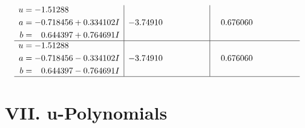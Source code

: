 \documentclass[1p]{elsarticle_modified}
\theoremstyle{definition}
\begin{document}
$$\begin{array}{c|c|c}
\begin{aligned}
u &= -1.51288\phantom{ +0.000000I} \\
a &= -0.718456 + 0.334102 I \\
b &= \phantom{-}0.644397 + 0.764691 I\end{aligned}
 & -3.74910\phantom{ +0.000000I} & \phantom{-}0.676060\phantom{ +0.000000I} \\ \hline\begin{aligned}
u &= -1.51288\phantom{ +0.000000I} \\
a &= -0.718456 - 0.334102 I \\
b &= \phantom{-}0.644397 - 0.764691 I\end{aligned}
 & -3.74910\phantom{ +0.000000I} & \phantom{-}0.676060\phantom{ +0.000000I}\\
 \hline 
 \end{array}$$\newpage
\newpage\renewcommand{\arraystretch}{1}
\centering \section*{ VII. u-Polynomials}
\end{document}
